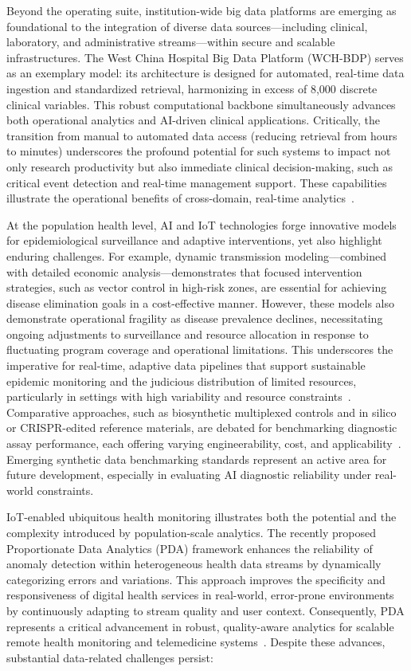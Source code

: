 \documentclass[sigconf]{acmart}
\begin{document}
Beyond the operating suite, institution-wide big data platforms are emerging as foundational to the integration of diverse data sources—including clinical, laboratory, and administrative streams—within secure and scalable infrastructures. The West China Hospital Big Data Platform (WCH-BDP) serves as an exemplary model: its architecture is designed for automated, real-time data ingestion and standardized retrieval, harmonizing in excess of 8,000 discrete clinical variables. This robust computational backbone simultaneously advances both operational analytics and AI-driven clinical applications. Critically, the transition from manual to automated data access (reducing retrieval from hours to minutes) underscores the profound potential for such systems to impact not only research productivity but also immediate clinical decision-making, such as critical event detection and real-time management support. These capabilities illustrate the operational benefits of cross-domain, real-time analytics~\cite{ref84}.

At the population health level, AI and IoT technologies forge innovative models for epidemiological surveillance and adaptive interventions, yet also highlight enduring challenges. For example, dynamic transmission modeling—combined with detailed economic analysis—demonstrates that focused intervention strategies, such as vector control in high-risk zones, are essential for achieving disease elimination goals in a cost-effective manner. However, these models also demonstrate operational fragility as disease prevalence declines, necessitating ongoing adjustments to surveillance and resource allocation in response to fluctuating program coverage and operational limitations. This underscores the imperative for real-time, adaptive data pipelines that support sustainable epidemic monitoring and the judicious distribution of limited resources, particularly in settings with high variability and resource constraints~\cite{ref61,ref63}. Comparative approaches, such as biosynthetic multiplexed controls and in silico or CRISPR-edited reference materials, are debated for benchmarking diagnostic assay performance, each offering varying engineerability, cost, and applicability~\cite{ref61}. Emerging synthetic data benchmarking standards represent an active area for future development, especially in evaluating AI diagnostic reliability under real-world constraints.

IoT-enabled ubiquitous health monitoring illustrates both the potential and the complexity introduced by population-scale analytics. The recently proposed Proportionate Data Analytics (PDA) framework enhances the reliability of anomaly detection within heterogeneous health data streams by dynamically categorizing errors and variations. This approach improves the specificity and responsiveness of digital health services in real-world, error-prone environments by continuously adapting to stream quality and user context. Consequently, PDA represents a critical advancement in robust, quality-aware analytics for scalable remote health monitoring and telemedicine systems~\cite{ref79}. Despite these advances, substantial data-related challenges persist:
\end{document}
